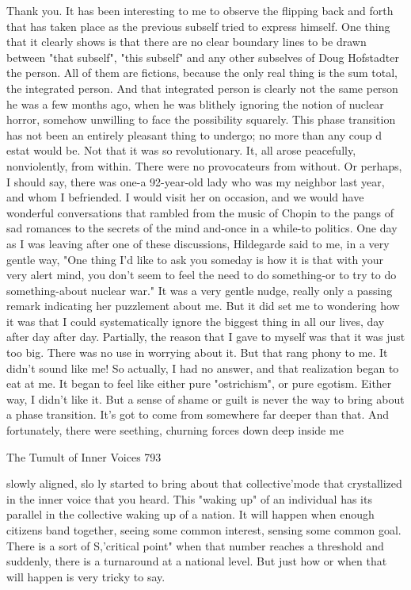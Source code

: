         Thank you. It has been interesting to me to observe the flipping back and forth
that has taken place as the previous subself tried to express himself. One thing that it
clearly shows is that there are no clear boundary lines to be drawn between "that
subself", "this subself" and any other subselves of Doug Hofstadter the person. All of
them are fictions, because the only real thing is the sum total, the integrated person.
And that integrated person is clearly not the same person he was a few months ago,
when he was blithely ignoring the notion of nuclear horror, somehow unwilling to
face the possibility squarely.
        This phase transition has not been an entirely pleasant thing to undergo; no
more than any coup d estat would be. Not that it was so revolutionary. It, all arose
peacefully, nonviolently, from within. There were no provocateurs from without. Or
perhaps, I should say, there was one-a 92-year-old lady who was my neighbor last
year, and whom I befriended. I would visit her on occasion, and we would have
wonderful conversations that rambled from the music of Chopin to the pangs of sad
romances to the secrets of the mind and-once in a while-to politics.
        One day as I was leaving after one of these discussions, Hildegarde said to me,
in a very gentle way, "One thing I'd like to ask you someday is how it is that with
your very alert mind, you don't seem to feel the need to do something-or to try to do
something-about nuclear war." It was a very gentle nudge, really only a passing
remark indicating her puzzlement about me. But it did set me to wondering how it
was that I could systematically ignore the biggest thing in all our lives, day after day
after day.
        Partially, the reason that I gave to myself was that it was just too big. There
was no use in worrying about it. But that rang phony to me. It didn't sound like me!
So actually, I had no answer, and that realization began to eat at me. It began to feel
like either pure "ostrichism", or pure egotism. Either way, I didn't like it. But a sense
of shame or guilt is never the way to bring about a phase transition. It's got to come
from somewhere far deeper than that. And fortunately, there were seething, churning
forces down deep inside me




The Tumult of Inner Voices                                                           793

slowly aligned, slo ly started to bring about that collective'mode that crystallized in
the inner voice that you heard.
        This "waking up" of an individual has its parallel in the collective waking up
of a nation. It will happen when enough citizens band together, seeing some common
interest, sensing some common goal. There is a sort of S,'critical point" when that
number reaches a threshold and suddenly, there is a turnaround at a national level. But
just how or when that will happen is very tricky to say.

